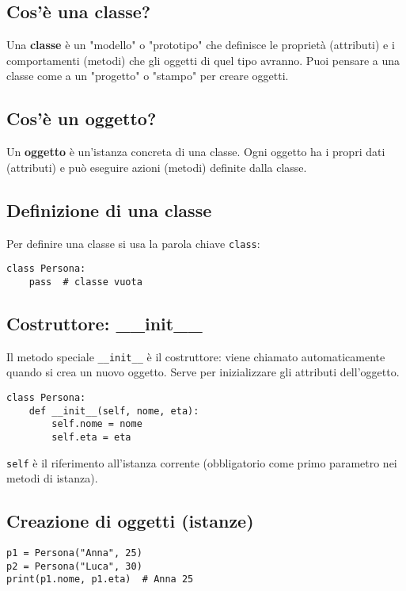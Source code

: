 \documentclass[a4paper,12pt]{article}
\begin{document}
\subsection*{Cos'è una classe?}
Una \textbf{classe} è un "modello" o "prototipo" che definisce le proprietà (attributi) e i comportamenti (metodi) che gli oggetti di quel tipo avranno. Puoi pensare a una classe come a un "progetto" o "stampo" per creare oggetti.

\subsection*{Cos'è un oggetto?}
Un \textbf{oggetto} è un'istanza concreta di una classe. Ogni oggetto ha i propri dati (attributi) e può eseguire azioni (metodi) definite dalla classe.

\subsection*{Definizione di una classe}
Per definire una classe si usa la parola chiave \texttt{class}:

\begin{lstlisting}
class Persona:
    pass  # classe vuota
\end{lstlisting}

\subsection*{Costruttore: \_\_init\_\_}
Il metodo speciale \texttt{\_\_init\_\_} è il costruttore: viene chiamato automaticamente quando si crea un nuovo oggetto. Serve per inizializzare gli attributi dell'oggetto.

\begin{lstlisting}
class Persona:
    def __init__(self, nome, eta):
        self.nome = nome
        self.eta = eta
\end{lstlisting}

\texttt{self} è il riferimento all'istanza corrente (obbligatorio come primo parametro nei metodi di istanza).

\subsection*{Creazione di oggetti (istanze)}
\begin{lstlisting}
p1 = Persona("Anna", 25)
p2 = Persona("Luca", 30)
print(p1.nome, p1.eta)  # Anna 25
\end{lstlisting}
\end{document}
